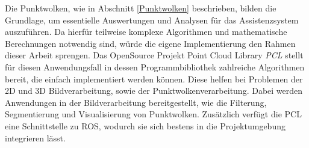 Die Punktwolken, wie in Abschnitt \ref{Punktwolken} beschrieben, bilden die Grundlage, um essentielle Auswertungen und Analysen für das Assistenzsystem auszuführen. Da hierfür teilweise komplexe Algorithmen und mathematische Berechnungen notwendig sind, würde die eigene Implementierung den Rahmen dieser Arbeit sprengen. \newline
Das OpenSource Projekt Point Cloud Library \emph{PCL} stellt für diesen Anwendungsfall in dessen Programmbibliothek zahlreiche Algorithmen bereit, die einfach implementiert werden können. Diese helfen bei Problemen der 2D und 3D Bildverarbeitung, sowie der Punktwolkenverarbeitung. %
Dabei werden Anwendungen in der Bildverarbeitung bereitgestellt, wie die Filterung, Segmentierung und Visualisierung von Punktwolken. \newline
Zusätzlich verfügt die PCL eine Schnittstelle zu ROS, wodurch sie sich bestens in die Projektumgebung integrieren lässt.